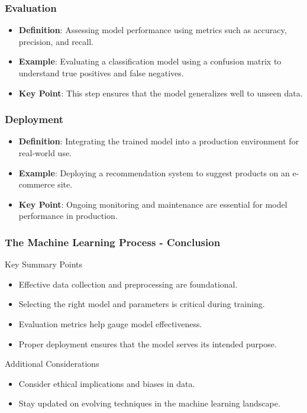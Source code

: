 \documentclass[aspectratio=169]{beamer}
\begin{document}
\begin{frame}[fragile]
    \frametitle{Evaluation}
    \begin{itemize}
        \item \textbf{Definition}: Assessing model performance using metrics such as accuracy, precision, and recall.
        \item \textbf{Example}: Evaluating a classification model using a confusion matrix to understand true positives and false negatives.
        \item \textbf{Key Point}: This step ensures that the model generalizes well to unseen data.
    \end{itemize}
\end{frame}

\begin{frame}[fragile]
    \frametitle{Deployment}
    \begin{itemize}
        \item \textbf{Definition}: Integrating the trained model into a production environment for real-world use.
        \item \textbf{Example}: Deploying a recommendation system to suggest products on an e-commerce site.
        \item \textbf{Key Point}: Ongoing monitoring and maintenance are essential for model performance in production.
    \end{itemize}
\end{frame}

\begin{frame}[fragile]
    \frametitle{The Machine Learning Process - Conclusion}
    \begin{block}{Key Summary Points}
        \begin{itemize}
            \item Effective data collection and preprocessing are foundational.
            \item Selecting the right model and parameters is critical during training.
            \item Evaluation metrics help gauge model effectiveness.
            \item Proper deployment ensures that the model serves its intended purpose.
        \end{itemize}
    \end{block}
    
    \begin{block}{Additional Considerations}
        \begin{itemize}
            \item Consider ethical implications and biases in data.
            \item Stay updated on evolving techniques in the machine learning landscape.
        \end{itemize}
    \end{block}
\end{frame}
\end{document}
